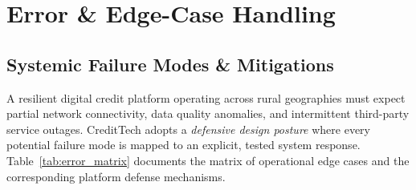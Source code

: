 \documentclass[11pt,a4paper,oneside]{report}
\begin{document}



\chapter{Error \& Edge-Case Handling}
\label{chap:error_handling}

\section{Systemic Failure Modes \& Mitigations}
A resilient digital credit platform operating across rural geographies must expect partial network connectivity, data quality anomalies, and intermittent third-party service outages. CreditTech adopts a \textit{defensive design posture} where every potential failure mode is mapped to an explicit, tested system response. Table~\ref{tab:error_matrix} documents the matrix of operational edge cases and the corresponding platform defense mechanisms.
\end{document}
